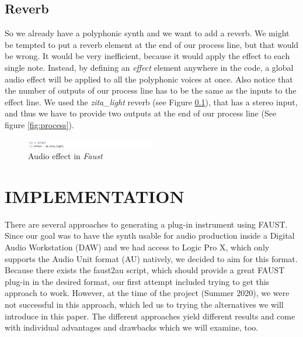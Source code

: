 \documentclass{aes2e}
\begin{document}
\subsection{Reverb}
\label{subsec:reverb}
So we already have a polyphonic synth and we want to add a reverb. We might be tempted to put a reverb element at the end of our process line, but that would be wrong. It would be very inefficient, because it would apply the effect to each single note. Instead, by defining an \textit{effect} element anywhere in the code, a global audio effect will be applied to all the polyphonic voices at once. Also notice that the number of outputs of our process line has to be the same as the inputs to the effect line. We used the \textit{zita\_light} reverb (see Figure \ref{subsec:reverb}), that has a stereo input, and thus we have to provide two outputs at the end of our process line (See figure \ref{fig:process}).

\begin{figure}[h]
\centering
\includegraphics[width=0.5\textwidth]{Figures/audio_effect.jpg}
\caption{Audio effect in \textit{Faust}}
\label{fig:audio_effect}
\end{figure}



\section{IMPLEMENTATION}
There are several approaches to generating a plug-in instrument using FAUST. Since our goal was to have the synth usable for audio production inside a Digital Audio Workstation (DAW) and we had access to Logic Pro X, which only supports the Audio Unit format (AU) natively, we decided to aim for this format. 
Because there exists the faust2au script, which should provide a great FAUST plug-in in the desired format, our first attempt included trying to get this approach to work. However, at the time of the project (Summer 2020), we were not successful in this approach, which led us to trying the alternatives we will introduce in this paper.
The different approaches yield different results and come with individual advantages and drawbacks which we will examine, too.
\end{document}
